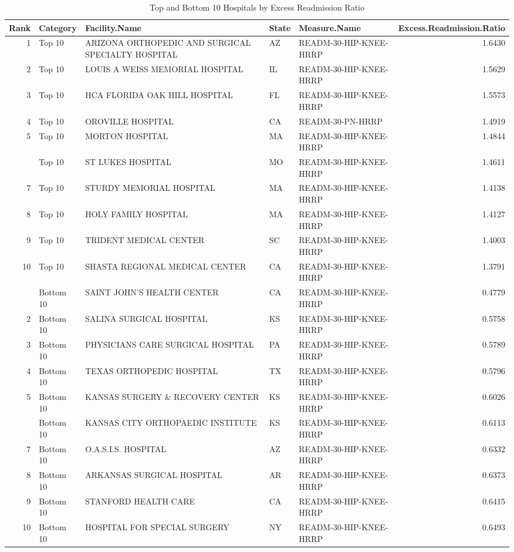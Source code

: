 \documentclass[
]{article}
\begin{document}
\begin{longtable}[t]{rllllr}
\caption{\label{tab:unnamed-chunk-6}Top and Bottom 10 Hospitals by Excess Readmission Ratio}\\
\toprule
Rank & Category & Facility.Name & State & Measure.Name & Excess.Readmission.Ratio\\
\midrule
1 & Top 10 & ARIZONA ORTHOPEDIC AND SURGICAL SPECIALTY HOSPITAL & AZ & READM-30-HIP-KNEE-HRRP & 1.6430\\
2 & Top 10 & LOUIS A WEISS MEMORIAL HOSPITAL & IL & READM-30-HIP-KNEE-HRRP & 1.5629\\
3 & Top 10 & HCA FLORIDA OAK HILL HOSPITAL & FL & READM-30-HIP-KNEE-HRRP & 1.5573\\
4 & Top 10 & OROVILLE HOSPITAL & CA & READM-30-PN-HRRP & 1.4919\\
5 & Top 10 & MORTON HOSPITAL & MA & READM-30-HIP-KNEE-HRRP & 1.4844\\
\addlinespace
6 & Top 10 & ST LUKES HOSPITAL & MO & READM-30-HIP-KNEE-HRRP & 1.4611\\
7 & Top 10 & STURDY MEMORIAL HOSPITAL & MA & READM-30-HIP-KNEE-HRRP & 1.4138\\
8 & Top 10 & HOLY FAMILY HOSPITAL & MA & READM-30-HIP-KNEE-HRRP & 1.4127\\
9 & Top 10 & TRIDENT MEDICAL CENTER & SC & READM-30-HIP-KNEE-HRRP & 1.4003\\
10 & Top 10 & SHASTA REGIONAL MEDICAL CENTER & CA & READM-30-HIP-KNEE-HRRP & 1.3791\\
\addlinespace
1 & Bottom 10 & SAINT JOHN'S HEALTH CENTER & CA & READM-30-HIP-KNEE-HRRP & 0.4779\\
2 & Bottom 10 & SALINA SURGICAL HOSPITAL & KS & READM-30-HIP-KNEE-HRRP & 0.5758\\
3 & Bottom 10 & PHYSICIANS CARE SURGICAL HOSPITAL & PA & READM-30-HIP-KNEE-HRRP & 0.5789\\
4 & Bottom 10 & TEXAS ORTHOPEDIC HOSPITAL & TX & READM-30-HIP-KNEE-HRRP & 0.5796\\
5 & Bottom 10 & KANSAS SURGERY \& RECOVERY CENTER & KS & READM-30-HIP-KNEE-HRRP & 0.6026\\
\addlinespace
6 & Bottom 10 & KANSAS CITY ORTHOPAEDIC INSTITUTE & KS & READM-30-HIP-KNEE-HRRP & 0.6113\\
7 & Bottom 10 & O.A.S.I.S. HOSPITAL & AZ & READM-30-HIP-KNEE-HRRP & 0.6332\\
8 & Bottom 10 & ARKANSAS SURGICAL HOSPITAL & AR & READM-30-HIP-KNEE-HRRP & 0.6373\\
9 & Bottom 10 & STANFORD HEALTH CARE & CA & READM-30-HIP-KNEE-HRRP & 0.6415\\
10 & Bottom 10 & HOSPITAL FOR SPECIAL SURGERY & NY & READM-30-HIP-KNEE-HRRP & 0.6493\\
\bottomrule
\end{longtable}
\end{document}
